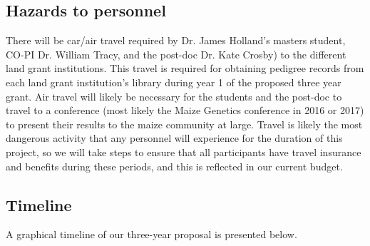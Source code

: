 \documentclass[12pt]{article}
\begin{document}
\subsection*{Hazards to personnel}
There will be car/air travel required by Dr. James Holland's masters student, CO-PI Dr. William Tracy, and the post-doc Dr. Kate Crosby) to the different land grant institutions. 
This travel is required for obtaining pedigree records from each land grant institution's library during year 1 of the proposed three year grant. Air travel will likely be necessary for the students and the post-doc to travel to a conference (most likely the Maize Genetics conference in 2016 or 2017) to present their results to the maize community at large. Travel is likely the most dangerous activity that any personnel will experience for the duration of this project, so we will take steps to ensure that all participants have travel insurance and benefits during these periods, and
this is reflected in our current budget. 


\subsection*{Timeline}
A graphical timeline of our three-year proposal is presented below.
\end{document}
